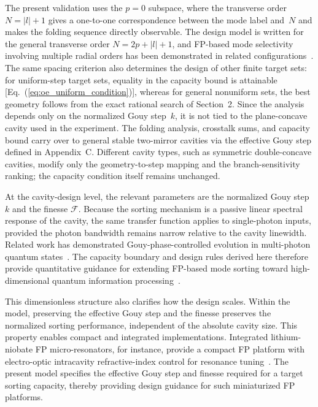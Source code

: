 \documentclass{optica-article}
\begin{document}
The present validation uses the $p{=}0$ subspace, where the transverse order $N=|l|+1$ gives a one-to-one correspondence between the mode label and~$N$ and makes the folding sequence directly observable. The design model is written for the general transverse order $N=2p+|l|+1$, and FP-based mode selectivity involving multiple radial orders has been demonstrated in related configurations~\cite{Vanani2022}. The same spacing criterion also determines the design of other finite target sets: for uniform-step target sets, equality in the capacity bound is attainable [Eq.~(\ref{eq:oe_uniform_condition})], whereas for general nonuniform sets, the best geometry follows from the exact rational search of Section~2. Since the analysis depends only on the normalized Gouy step~$k$, it is not tied to the plane-concave cavity used in the experiment. The folding analysis, crosstalk sums, and capacity bound carry over to general stable two-mirror cavities via the effective Gouy step defined in Appendix~C. Different cavity types, such as symmetric double-concave cavities, modify only the geometry-to-step mapping and the branch-sensitivity ranking; the capacity condition itself remains unchanged.

At the cavity-design level, the relevant parameters are the normalized Gouy step $k$ and the finesse $\mathcal{F}$. Because the sorting mechanism is a passive linear spectral response of the cavity, the same transfer function applies to single-photon inputs, provided the photon bandwidth remains narrow relative to the cavity linewidth. Related work has demonstrated Gouy-phase-controlled evolution in multi-photon quantum states~\cite{Hiekkamaki2022}. The capacity boundary and design rules derived here therefore provide quantitative guidance for extending FP-based mode sorting toward high-dimensional quantum information processing~\cite{Brandt2020,Cozzolino2019}.

This dimensionless structure also clarifies how the design scales. Within the model, preserving the effective Gouy step and the finesse preserves the normalized sorting performance, independent of the absolute cavity size. This property enables compact and integrated implementations. Integrated lithium-niobate FP micro-resonators, for instance, provide a compact FP platform with electro-optic intracavity refractive-index control for resonance tuning~\cite{Hwang2026_npjNano}. The present model specifies the effective Gouy step and finesse required for a target sorting capacity, thereby providing design guidance for such miniaturized FP platforms.
\end{document}
